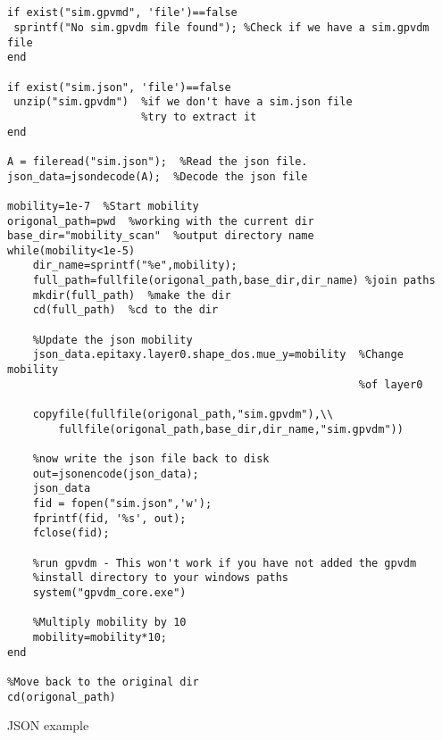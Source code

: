 \begin{listing}[H]
\begin{verbatim}


if exist("sim.gpvmd", 'file')==false
 sprintf("No sim.gpvdm file found"); %Check if we have a sim.gpvdm file
end

if exist("sim.json", 'file')==false
 unzip("sim.gpvdm")  %if we don't have a sim.json file
					 %try to extract it
end

A = fileread("sim.json");  %Read the json file.
json_data=jsondecode(A);  %Decode the json file

mobility=1e-7  %Start mobility
origonal_path=pwd  %working with the current dir
base_dir="mobility_scan"  %output directory name
while(mobility<1e-5)
    dir_name=sprintf("%e",mobility);
    full_path=fullfile(origonal_path,base_dir,dir_name)	%join paths
    mkdir(full_path)  %make the dir
    cd(full_path)  %cd to the dir

	%Update the json mobility
    json_data.epitaxy.layer0.shape_dos.mue_y=mobility  %Change mobility
													   %of layer0
    
    copyfile(fullfile(origonal_path,"sim.gpvdm"),\\
		fullfile(origonal_path,base_dir,dir_name,"sim.gpvdm"))

	%now write the json file back to disk
    out=jsonencode(json_data);
    json_data
    fid = fopen("sim.json",'w');
    fprintf(fid, '%s', out);
    fclose(fid);

	%run gpvdm - This won't work if you have not added the gpvdm
	%install directory to your windows paths 
    system("gpvdm_core.exe")
    
	%Multiply mobility by 10
    mobility=mobility*10;
end

%Move back to the original dir
cd(origonal_path)

\end{verbatim}
\caption{JSON example} 
\label{json-example}
\end{listing}
